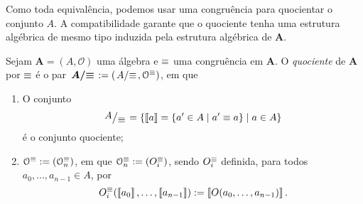 Como toda equivalência, podemos usar uma congruência para quocientar o conjunto $A$. A compatibilidade garante que o quociente tenha uma estrutura algébrica de mesmo tipo induzida pela estrutura algébrica de $\bm A$.

\begin{definition}
Sejam $\bm A = (A,\mathcal O)$ uma álgebra e $\equiv$ uma congruência em $\bm A$. O \emph{quociente} de $\bm A$ por $\equiv$ é o par $\bm{\quo{A}{\congr}} := (\quo{A}{\congr},\mathcal O^\congr)$, em que
	\begin{enumerate}
		\item O conjunto
			\begin{equation*}
				\quo{A}{\congr} = \set{\cla{a} = \set{a' \in A}{a' \congr a}}{a \in A}
			\end{equation*}
		é o conjunto quociente;
		
		\item $\mathcal O^\equiv := (\mathcal O_n^\equiv)$, em que $\mathcal O_n^\equiv := (O_i^\equiv)$, sendo $O_i^\equiv$ definida, para todos $a_0,\ldots,a_{n-1} \in A$, por
			\begin{equation*}
				O_i^\equiv(\left\llbracket{a_0}\right\rrbracket,\ldots,\left\llbracket{a_{n-1}}\right\rrbracket) := \left\llbracket{O(a_0,\ldots,a_{n-1})}\right\rrbracket.
			\end{equation*}
	\end{enumerate}
\end{definition}

